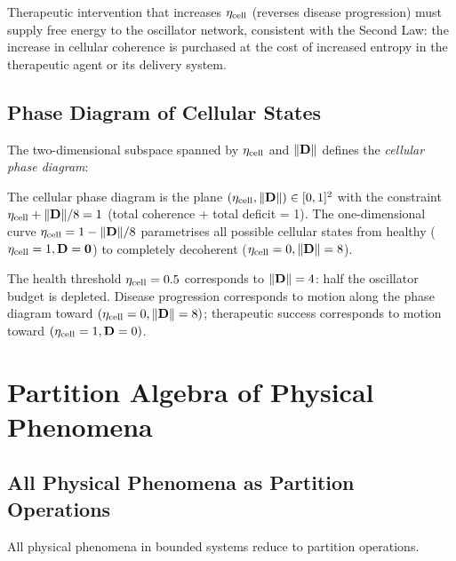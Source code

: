\begin{corollary}
\label{cor:therapeutic}
Therapeutic intervention that increases $\eta_{\mathrm{cell}}$ (reverses disease
progression) must supply free energy to the oscillator network, consistent
with the Second Law: the increase in cellular coherence is purchased at the
cost of increased entropy in the therapeutic agent or its delivery system.
\end{corollary}

\subsection{Phase Diagram of Cellular States}

The two-dimensional subspace spanned by $\eta_{\mathrm{cell}}$ and $\|\mathbf{D}\|$ defines
the \emph{cellular phase diagram}:

\begin{definition}
\label{def:phase-diagram}
The cellular phase diagram is the plane $(\eta_{\mathrm{cell}}, \|\mathbf{D}\|) \in [0,1]^2$
with the constraint $\eta_{\mathrm{cell}} + \|\mathbf{D}\|/8 = 1$ (total coherence + total
deficit = 1).  The one-dimensional curve $\eta_{\mathrm{cell}} = 1 - \|\mathbf{D}\|/8$
parametrises all possible cellular states from healthy ($\eta_{\mathrm{cell}} = 1,
\mathbf{D} = \mathbf{0}$) to completely decoherent ($\eta_{\mathrm{cell}} = 0,
\|\mathbf{D}\| = 8$).
\end{definition}

The health threshold $\eta_{\mathrm{cell}} = 0.5$ corresponds to $\|\mathbf{D}\| = 4$:
half the oscillator budget is depleted.  Disease progression corresponds to
motion along the phase diagram toward $(\eta_{\mathrm{cell}} = 0, \|\mathbf{D}\| = 8)$;
therapeutic success corresponds to motion toward $(\eta_{\mathrm{cell}} = 1, \mathbf{D} = 0)$.

\section{Partition Algebra of Physical Phenomena}
\label{sec:partition-algebra-physical}

\subsection{All Physical Phenomena as Partition Operations}

\begin{theorem}
\label{thm:universal-partition}
All physical phenomena in bounded systems reduce to partition operations.
\end{theorem}

